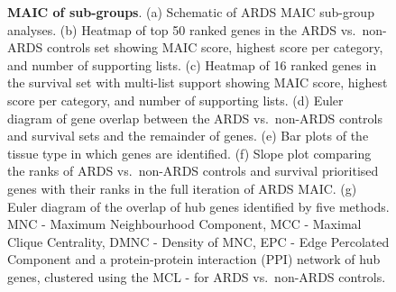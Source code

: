\documentclass[
  11,
  a4paper,
]{article}
\begin{document}
\begin{figure}


\caption{\label{fig-fig3}\textbf{MAIC of sub-groups}. (a) Schematic of
ARDS MAIC sub-group analyses. (b) Heatmap of top 50 ranked genes in the
ARDS vs.~non-ARDS controls set showing MAIC score, highest score per
category, and number of supporting lists. (c) Heatmap of 16 ranked genes
in the survival set with multi-list support showing MAIC score, highest
score per category, and number of supporting lists. (d) Euler diagram of
gene overlap between the ARDS vs.~non-ARDS controls and survival sets
and the remainder of genes. (e) Bar plots of the tissue type in which
genes are identified. (f) Slope plot comparing the ranks of ARDS
vs.~non-ARDS controls and survival prioritised genes with their ranks in
the full iteration of ARDS MAIC. (g) Euler diagram of the overlap of hub
genes identified by five methods. MNC - Maximum Neighbourhood Component,
MCC - Maximal Clique Centrality, DMNC - Density of MNC, EPC - Edge
Percolated Component and a protein-protein interaction (PPI) network of
hub genes, clustered using the MCL - for ARDS vs.~non-ARDS controls.}

\end{figure}%
\end{document}
